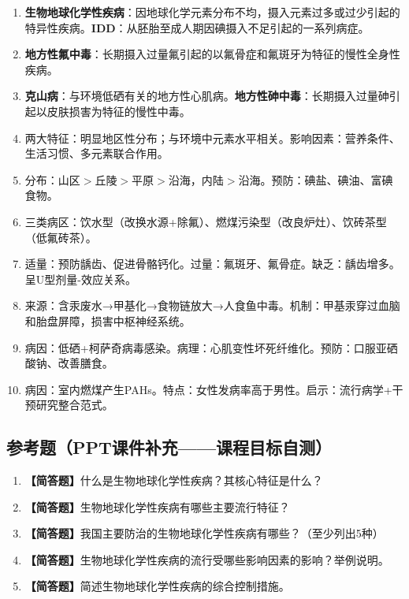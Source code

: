 \begin{enumerate}[leftmargin=*, itemsep=5pt]
    \item \textbf{生物地球化学性疾病}：因地球化学元素分布不均，摄入元素过多或过少引起的特异性疾病。\textbf{IDD}：从胚胎至成人期因碘摄入不足引起的一系列病症。

    \item \textbf{地方性氟中毒}：长期摄入过量氟引起的以氟骨症和氟斑牙为特征的慢性全身性疾病。

    \item \textbf{克山病}：与环境低硒有关的地方性心肌病。\textbf{地方性砷中毒}：长期摄入过量砷引起以皮肤损害为特征的慢性中毒。

    \item 两大特征：明显地区性分布；与环境中元素水平相关。影响因素：营养条件、生活习惯、多元素联合作用。

    \item 分布：山区$>$丘陵$>$平原$>$沿海，内陆$>$沿海。预防：碘盐、碘油、富碘食物。

    \item 三类病区：饮水型（改换水源+除氟）、燃煤污染型（改良炉灶）、饮砖茶型（低氟砖茶）。

    \item 适量：预防龋齿、促进骨骼钙化。过量：氟斑牙、氟骨症。缺乏：龋齿增多。呈U型剂量-效应关系。

    \item 来源：含汞废水→甲基化→食物链放大→人食鱼中毒。机制：甲基汞穿过血脑和胎盘屏障，损害中枢神经系统。

    \item 病因：低硒+柯萨奇病毒感染。病理：心肌变性坏死纤维化。预防：口服亚硒酸钠、改善膳食。

    \item 病因：室内燃煤产生PAHs。特点：女性发病率高于男性。启示：流行病学+干预研究整合范式。
\end{enumerate}

\subsection*{参考题（PPT课件补充——课程目标自测）}

\begin{enumerate}[leftmargin=*, itemsep=10pt]
    \item \textbf{【简答题】}什么是生物地球化学性疾病？其核心特征是什么？
    \item \textbf{【简答题】}生物地球化学性疾病有哪些主要流行特征？
    \item \textbf{【简答题】}我国主要防治的生物地球化学性疾病有哪些？（至少列出5种）
    \item \textbf{【简答题】}生物地球化学性疾病的流行受哪些影响因素的影响？举例说明。
    \item \textbf{【简答题】}简述生物地球化学性疾病的综合控制措施。
\end{enumerate}

